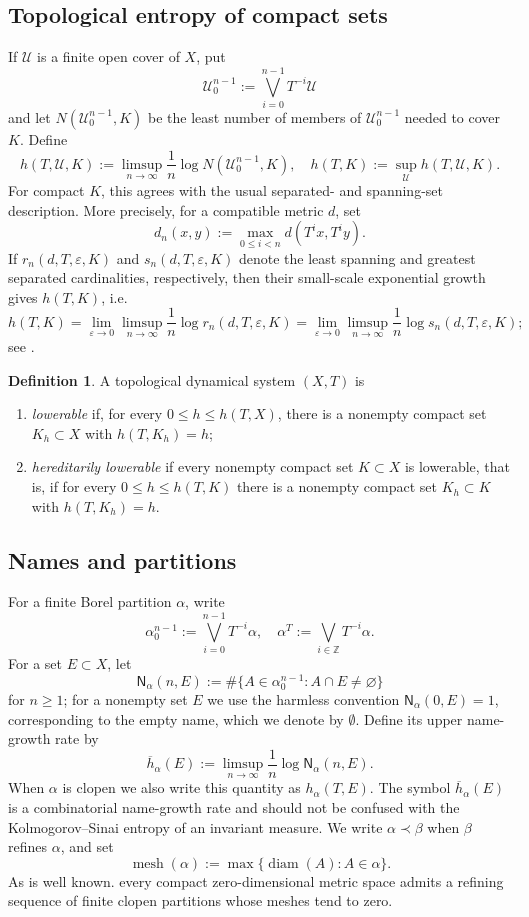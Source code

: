 \documentclass[12pt,letterpaper,reqno]{amsart}
\newcommand{\Z}{\mathbb Z}
\newcommand{\cU}{\mathcal U}
\newcommand{\join}{\bigvee}
\newcommand{\mesh}{\operatorname{mesh}}
\newcommand{\Nname}{\mathsf N}
\DeclareMathOperator{\diam}{diam}
\theoremstyle{definition}
\newtheorem{definition}[theorem]{Definition}
\theoremstyle{remark}
\numberwithin{equation}{section}
\begin{document}
	\subsection{Topological entropy of compact sets}
	
	If $\cU$ is a finite open cover of $X$, put
	\[
	\cU_0^{n-1}:=\join_{i=0}^{n-1}T^{-i}\cU
	\]
	and let $N(\cU_0^{n-1},K)$ be the least number of members of
	$\cU_0^{n-1}$ needed to cover $K$. Define
	\[
	h(T,\cU,K)
	:=
	\limsup_{n\to\infty}
	\frac1n\log N(\cU_0^{n-1},K),
	\quad
	h(T,K):=\sup_{\cU}h(T,\cU,K).
	\]
	For compact $K$, this agrees with the usual separated- and spanning-set
	description. More precisely, for a compatible metric $d$, set
	\[
	d_n(x,y):=\max_{0\leq i<n}d(T^ix,T^iy).
	\]
	If $r_n(d,T,\varepsilon,K)$ and $s_n(d,T,\varepsilon,K)$ denote the least
	spanning and greatest separated cardinalities, respectively, then their
	small-scale exponential growth gives $h(T,K)$, i.e. 
	\[h(T,K)=\lim_{\varepsilon\to 0}\limsup_{n\to\infty}\frac{1}{n}\log r_n(d,T,\varepsilon,K)=\lim_{\varepsilon\to 0}\limsup_{n\to\infty}\frac{1}{n}\log s_n(d,T,\varepsilon,K);\] see
	\cite{Bowen1973,Misiurewicz2004}.
	
	\begin{definition}
		\label{def:lowerable}
		A topological dynamical system $(X,T)$ is
		\begin{enumerate}
			\item \emph{lowerable} if, for every $0\leq h\leq h(T,X)$, there is a
			nonempty compact set $K_h\subset X$ with $h(T,K_h)=h$;
			\item \emph{hereditarily lowerable} if every nonempty compact set
			$K\subset X$ is lowerable, that is, if for every
			$0\leq h\leq h(T,K)$ there is a nonempty compact set
			$K_h\subset K$ with $h(T,K_h)=h$.
		\end{enumerate}
	\end{definition}
	
	\subsection{Names and partitions}
	
	For a finite Borel partition $\alpha$, write
	\[
	\alpha_0^{n-1}:=\join_{i=0}^{n-1}T^{-i}\alpha,
	\quad
	\alpha^T:=\join_{i\in\Z}T^{-i}\alpha.
	\]
	For a set $E\subset X$, let
	\[
	\Nname_\alpha(n,E)
	:=
	\#\{A\in\alpha_0^{n-1}:A\cap E\neq\varnothing\}
	\]
	for $n\geq1$; for a nonempty set $E$ we use the harmless convention
	$\Nname_\alpha(0,E)=1$, corresponding to the empty name, which we denote by $\emptyset$.  Define its upper
	name-growth rate by
	\[
	\overline h_\alpha(E)
	:=
	\limsup_{n\to\infty}\frac1n\log\Nname_\alpha(n,E).
	\]
	When $\alpha$ is clopen we also write this quantity as
	$h_\alpha(T,E)$. The symbol $\overline h_\alpha(E)$ is a combinatorial
	name-growth rate and should not be confused with the Kolmogorov--Sinai entropy
	of an invariant measure. We write $\alpha\prec\beta$ when $\beta$ refines
	$\alpha$, and set
	\[
	\mesh(\alpha):=\max\{\diam(A):A\in\alpha\}.
	\]
	As is well known. every compact zero-dimensional metric space admits a refining sequence of
	finite clopen partitions whose meshes tend to zero.
\end{document}
